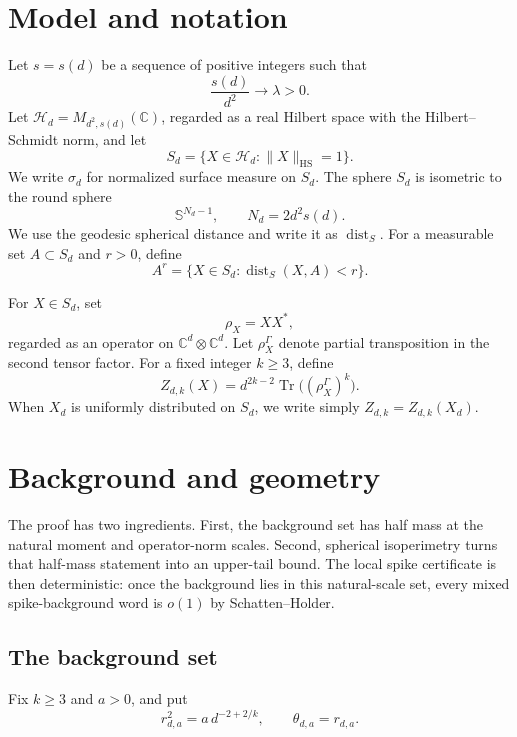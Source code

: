 \documentclass[11pt]{article}
\DeclareMathOperator{\Tr}{Tr}
\DeclareMathOperator{\dist}{dist}
\newcommand{\HS}{\mathrm{HS}}
\newcommand{\C}{\mathbb C}
\newcommand{\Sphere}{\mathbb S}
\begin{document}
\section{Model and notation}

Let $s=s(d)$ be a sequence of positive integers such that
\begin{equation}\label{eq:balanced}
  \frac{s(d)}{d^2}\longrightarrow \lambda>0 .
\end{equation}
Let $\mathcal H_d=M_{d^2,s(d)}(\C)$, regarded as a real Hilbert space with the Hilbert--Schmidt norm, and let
\[
  S_d=\{X\in \mathcal H_d:\|X\|_{\HS}=1\}.
\]
We write $\sigma_d$ for normalized surface measure on $S_d$.  The sphere $S_d$ is isometric to the round sphere
\[
  \Sphere^{N_d-1},\qquad N_d=2d^2s(d).
\]
We use the geodesic spherical distance and write it as $\dist_S$.  For a measurable set $A\subset S_d$ and $r>0$, define
\[
  A^r=\{X\in S_d:\dist_S(X,A)<r\}.
\]

For $X\in S_d$, set
\[
  \rho_X=XX^*,
\]
regarded as an operator on $\C^d\otimes\C^d$.  Let $\rho_X^\Gamma$ denote partial transposition in the second tensor factor.  For a fixed integer $k\ge 3$, define
\begin{equation}\label{eq:Zd}
  Z_{d,k}(X)=d^{2k-2}\Tr\bigl((\rho_X^\Gamma)^k\bigr).
\end{equation}
When $X_d$ is uniformly distributed on $S_d$, we write simply $Z_{d,k}=Z_{d,k}(X_d)$.

\section{Background and geometry}

The proof has two ingredients.  First, the background set has half mass at the
natural moment and operator-norm scales.  Second, spherical isoperimetry turns
that half-mass statement into an upper-tail bound.  The local spike certificate
is then deterministic: once the background lies in this natural-scale set,
every mixed spike-background word is \(o(1)\) by Schatten--Holder.

\subsection{The background set}

Fix \(k\ge 3\) and \(a>0\), and put
\begin{equation}\label{eq:radius}
  r_{d,a}^2=a\,d^{-2+2/k},
  \qquad
  \theta_{d,a}=r_{d,a}.
\end{equation}
\end{document}

